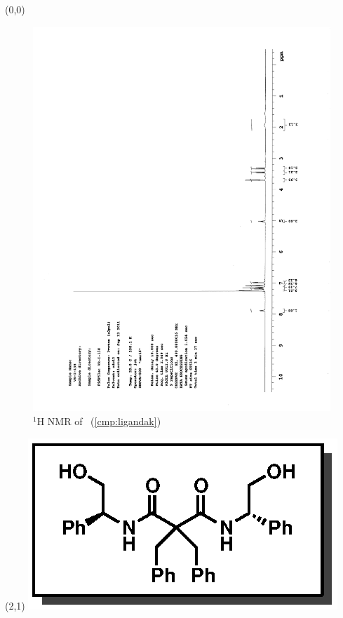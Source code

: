 \begin{textblock}{20}(0,0)
\begin{figure}[htb]
\caption{$^1$H NMR of \CMPligandak\ (\ref{cmp:ligandak})}
\includegraphics[scale=0.75, trim = 0mm 0mm 0mm 5mm,
clip]{chp_asymmetric/images/nmr/ligandakH}
\vspace{-100pt}
\end{figure}
\end{textblock}
\begin{textblock}{1}(2,1)
\includegraphics[scale=0.8, angle=90]{chp_asymmetric/images/ligandak}
\end{textblock}
